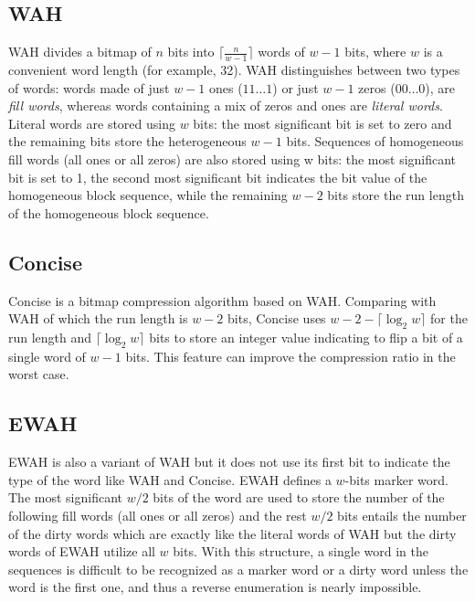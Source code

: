 \subsection{WAH}

WAH \citep{wu2006optimizing} divides a bitmap of $n$ bits into $\lceil \frac{n}{w-1}\rceil$ words of $w -1$ bits, where $w$ is a convenient word length (for example, 32). WAH distinguishes between two types of words: words made of just
$w-1$ ones ($11\dots 1$) or just $w-1$ zeros ($00\dots 0$), are \emph{fill words}, whereas words containing a mix of zeros and ones are \emph{literal words}. Literal words are stored using $w$ bits: the most significant bit is set to zero and the remaining bits store the heterogeneous $w-1$ bits. Sequences of homogeneous fill words (all ones or all zeros) are also stored using w bits: the most significant bit is set to 1, the second most significant bit indicates the bit value of the homogeneous block sequence, while the remaining $w-2$ bits store the run length of the homogeneous block sequence.

\subsection{Concise}

Concise \citep{colantonio2010} is a bitmap compression algorithm based on WAH. Comparing with WAH of which the run length is $w-2$ bits, Concise uses $w - 2 - \lceil \log_2 w \rceil$ for the run length and $\lceil \log_2 w \rceil$ bits to store an integer value indicating to flip a bit of a single word of $w-1$ bits. This feature can improve the compression ratio in the worst case.

\subsection{EWAH}

EWAH \citep{lemire2010} is also a variant of WAH but it does not use its first bit to indicate the type of the word like WAH and Concise. EWAH defines a $w$-bits marker word. The most significant $w/2$ bits of the word are used to store the number of the following fill words (all ones or all zeros) and the rest $w/2$ bits entails the number of the dirty words which are exactly like the literal words of WAH but the dirty words of EWAH utilize all $w$ bits. With this structure, a single word in the sequences is difficult to be recognized as a marker word or a dirty word unless the word is the first one, and thus a reverse enumeration is nearly impossible.

